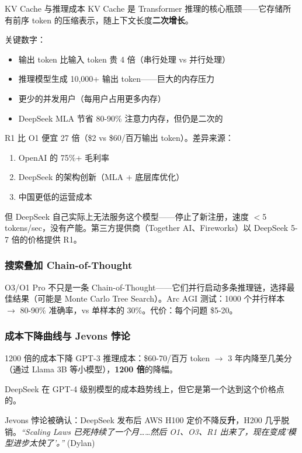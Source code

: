 \begin{knowledgebox}{KV Cache 与推理成本}
KV Cache 是 Transformer 推理的核心瓶颈——它存储所有前序 token 的压缩表示，随上下文长度\textbf{二次增长}。

关键数字：
\begin{itemize}
    \item 输出 token 比输入 token 贵 4 倍（串行处理 vs 并行处理）
    \item 推理模型生成 10,000+ 输出 token——巨大的内存压力
    \item 更少的并发用户（每用户占用更多内存）
    \item DeepSeek MLA 节省 80-90\% 注意力内存，但仍是二次的
\end{itemize}

R1 比 O1 便宜 27 倍（\$2 vs \$60/百万输出 token）。差异来源：
\begin{enumerate}
    \item OpenAI 的 75\%+ 毛利率
    \item DeepSeek 的架构创新（MLA + 底层库优化）
    \item 中国更低的运营成本
\end{enumerate}

但 DeepSeek 自己实际上无法服务这个模型——停止了新注册，速度 $<$5 tokens/sec，没有产能。第三方提供商（Together AI、Fireworks）以 DeepSeek 5-7 倍的价格提供 R1。
\end{knowledgebox}

\subsubsection{搜索叠加 Chain-of-Thought}

O3/O1 Pro 不只是一条 Chain-of-Thought——它们并行启动多条推理链，选择最佳结果（可能是 Monte Carlo Tree Search）。Arc AGI 测试：1000 个并行样本 $\to$ 80-90\% 准确率，vs 单样本的 30\%。代价：每个问题 \$5-20。

\subsubsection{成本下降曲线与 Jevons 悖论}

\begin{importantbox}{1200 倍的成本下降}
GPT-3 推理成本：\$60-70/百万 token $\to$ 3 年内降至几美分（通过 Llama 3B 等小模型），\textbf{1200 倍}的降幅。

DeepSeek 在 GPT-4 级别模型的成本趋势线上，但它是第一个达到这个价格点的。

Jevons 悖论被确认：DeepSeek 发布后 AWS H100 定价不降反\textbf{升}，H200 几乎脱销。\textit{``Scaling Laws 已死持续了一个月……然后 O1、O3、R1 出来了，现在变成'模型进步太快了'。''} (Dylan)
\end{importantbox}

